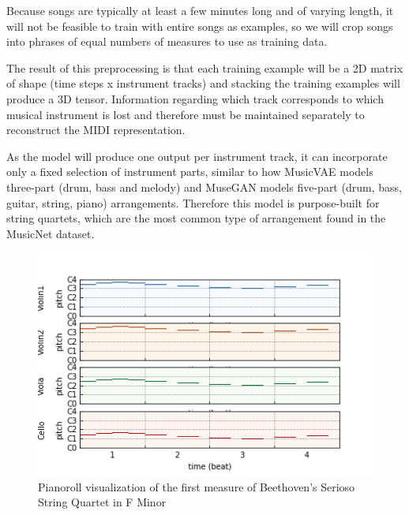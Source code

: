 \documentclass[sigconf,authorversion]{acmart}
\begin{document}
Because songs are typically at least a few minutes long and of varying
length, it will not be feasible to train with entire songs as
examples, so we will crop songs into phrases of equal numbers of
measures to use as training data.

The result of this preprocessing is that each training example will be
a 2D matrix of shape (time steps x instrument tracks) and stacking the
training examples will produce a 3D tensor. Information regarding which
track corresponds to which musical instrument is lost and therefore
must be maintained separately to reconstruct the MIDI representation.

As the model will produce one output per instrument track, it can
incorporate only a fixed selection of instrument parts, similar to how
MusicVAE models three-part (drum, bass and melody)
\cite{roberts_hierarchical_2018} and MuseGAN models five-part (drum,
bass, guitar, string, piano) arrangements. Therefore this model is
purpose-built for string quartets, which are the most common type of
arrangement found in the MusicNet dataset.

\begin{figure}[h]
  \centering
  \includegraphics[width=\linewidth]{first_bar.png}
  \caption{Pianoroll visualization of the first measure of
    Beethoven's Serioso String Quartet in F Minor}
  \label{pianoroll}
\end{figure}
\end{document}
